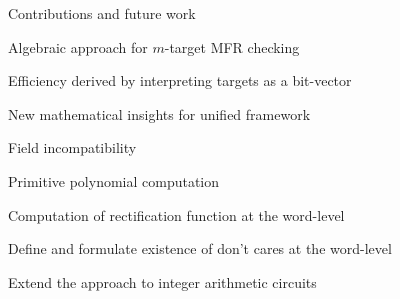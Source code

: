
\begin{frame}{\large Contributions and future work}
\bi

	\item Algebraic approach for $m$-target MFR checking
	\bi
		\item Efficiency derived by interpreting targets as a bit-vector
	\ei
	\pause
	\item New mathematical insights for unified framework
	\bi
		\item Field incompatibility
		\item Primitive polynomial computation
	\ei
	\pause
	\vspace{0.1in}
	\vspace{0.1in}
	\item Computation of rectification function at the word-level
	\bi
		\item Define and formulate existence of don't cares at the word-level
	\ei
	\pause
	\item Extend the approach to integer arithmetic circuits
\ei
\end{frame}


